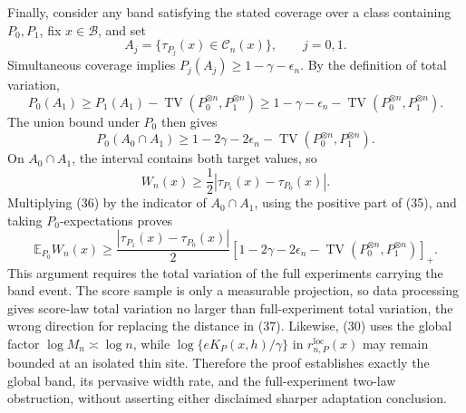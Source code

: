 Finally, consider any band satisfying the stated coverage over a class containing \(P_0,P_1\), fix \(x\in\mathcal B\), and set
\[
A_j=\{\tau_{P_j}(x)\in\mathcal C_n(x)\},\qquad j=0,1.
\]
Simultaneous coverage implies \(P_j(A_j)\ge1-\gamma-\epsilon_n\). By the definition of total variation,
\[
P_0(A_1)
\ge P_1(A_1)-\operatorname{TV}(P_0^{\otimes n},P_1^{\otimes n})
\ge1-\gamma-\epsilon_n-
\operatorname{TV}(P_0^{\otimes n},P_1^{\otimes n}). \tag{34}
\]
The union bound under \(P_0\) then gives
\[
P_0(A_0\cap A_1)
\ge1-2\gamma-2\epsilon_n-
\operatorname{TV}(P_0^{\otimes n},P_1^{\otimes n}). \tag{35}
\]
On \(A_0\cap A_1\), the interval contains both target values, so
\[
W_n(x)\ge\frac12|\tau_{P_1}(x)-\tau_{P_0}(x)|. \tag{36}
\]
Multiplying (36) by the indicator of \(A_0\cap A_1\), using the positive part of (35), and taking \(P_0\)-expectations proves
\[
\mathbb E_{P_0}W_n(x)\ge
\frac{|\tau_{P_1}(x)-\tau_{P_0}(x)|}{2}
\left[1-2\gamma-2\epsilon_n-
\operatorname{TV}(P_0^{\otimes n},P_1^{\otimes n})\right]_+. \tag{37}
\]
This argument requires the total variation of the full experiments carrying the band event. The score sample is only a measurable projection, so data processing gives score-law total variation no larger than full-experiment total variation, the wrong direction for replacing the distance in (37). Likewise, (30) uses the global factor \(\log M_n\asymp\log n\), while \(\log\{eK_P(x,h)/\gamma\}\) in \(r_{n,P}^{\mathrm{loc}}(x)\) may remain bounded at an isolated thin site. Therefore the proof establishes exactly the global band, its pervasive width rate, and the full-experiment two-law obstruction, without asserting either disclaimed sharper adaptation conclusion.